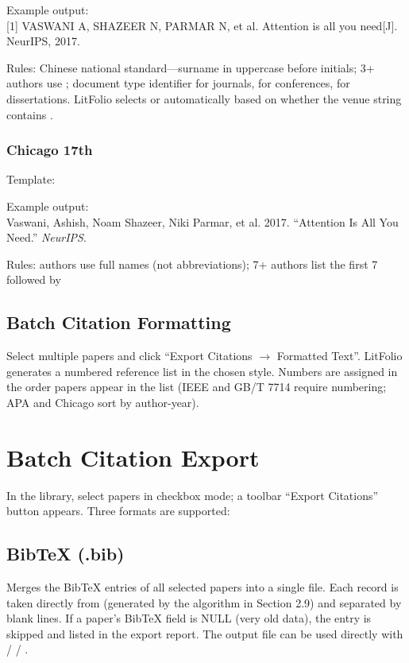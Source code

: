 Example output:\\
{[}1{]} VASWANI A, SHAZEER N, PARMAR N, et al. Attention is all you need[J].
NeurIPS, 2017.

Rules: Chinese national standard---surname in uppercase before initials; 3+ authors
use ; document type identifier \cmd{[J]} for journals, \cmd{[C]} for
conferences, \cmd{[D]} for dissertations. LitFolio selects \cmd{[J]} or \cmd{[C]}
automatically based on whether the venue string contains
.

\subsubsection{Chicago 17th}

Template:

Example output:\\
Vaswani, Ashish, Noam Shazeer, Niki Parmar, et al. 2017.
``Attention Is All You Need.'' \textit{NeurIPS}.

Rules: authors use full names (not abbreviations); 7+ authors list the first 7
followed by 

\subsection{Batch Citation Formatting}

Select multiple papers and click ``Export Citations $\to$ Formatted Text''. LitFolio
generates a numbered reference list in the chosen style. Numbers are assigned in the
order papers appear in the list (IEEE and GB/T 7714 require numbering; APA and Chicago
sort by author-year).

\section{Batch Citation Export}

In the library, select papers in checkbox mode; a toolbar ``Export Citations'' button
appears. Three formats are supported:

\subsection{BibTeX (.bib)}

Merges the BibTeX entries of all selected papers into a single  file. Each
record is taken directly from  (generated by the algorithm in
Section 2.9) and separated by blank lines. If a paper's BibTeX field is NULL (very
old data), the entry is skipped and listed in the export report. The output file can
be used directly with  /  / .

